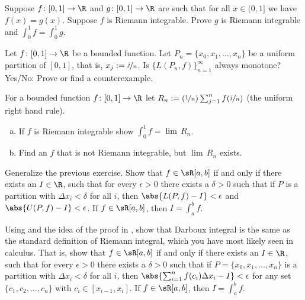 \documentclass[12pt]{book}
\begin{document}
\begin{exercise}
Suppose $f \colon [0,1] \to \R$ and $g \colon [0,1] \to \R$
are such that for all $x \in (0,1]$
we have $f(x) = g(x)$.
Suppose $f$ is Riemann integrable. 
Prove $g$ is Riemann integrable and $\int_{0}^1 f = \int_{0}^1 g$.
\end{exercise}

\begin{exercise}
Let $f \colon [0,1] \to \R$ be a bounded function.
Let $P_n = \{ x_0,x_1,\ldots,x_n \}$ be a uniform partition of $[0,1]$,
that is, $x_j := \nicefrac{j}{n}$.
Is $\{ L(P_n,f) \}_{n=1}^\infty$
always monotone?
  Yes/No: Prove or find a counterexample.
\end{exercise}

\begin{exercise}[Challenging]
For a bounded function $f \colon [0,1] \to \R$ let
$R_n := (\nicefrac{1}{n})\sum_{j=1}^n f(\nicefrac{j}{n})$ (the
uniform right hand rule).
\begin{enumerate}[a)]
 \item If $f$ is Riemann integrable show $\int_0^1 f = \lim \, R_n$.
 \item Find an $f$ that is not Riemann integrable, but $\lim \, R_n$ exists.
\end{enumerate}
\end{exercise}

\begin{exercise}[Challenging] \label{exercise:riemannintdarboux}
Generalize the previous exercise.
Show that $f \in \sR[a,b]$ if and only if there exists an $I \in \R$,
such that for every $\epsilon > 0$ there exists
a $\delta > 0$ such that if $P$ is a partition with $\Delta x_i < \delta$
for all $i$, then
$\abs{L(P,f) - I} < \epsilon$ and
$\abs{U(P,f) - I} < \epsilon$.
If $f \in \sR[a,b]$, then $I = \int_a^b f$.
\end{exercise}

\begin{exercise} \label{exercise:riemannintdarboux2}
Using  and the idea of
the proof in , show that 
Darboux integral is the same as the standard definition
of Riemann integral, which you have most likely seen in calculus.
That is,
show that
$f \in \sR[a,b]$ if and only if there exists an $I \in \R$,
such that for every $\epsilon > 0$ there exists
a $\delta > 0$ such that if $P = \{ x_0,x_1,\ldots,x_n \}$
is a partition with $\Delta x_i < \delta$
for all $i$, then
$\abs{\sum_{i=1}^n f(c_i) \Delta x_i - I} < \epsilon$ for any set
$\{ c_1,c_2,\ldots,c_n \}$ with $c_i \in [x_{i-1},x_i]$.
If $f \in \sR[a,b]$, then $I = \int_a^b f$.
\end{exercise}
\end{document}

